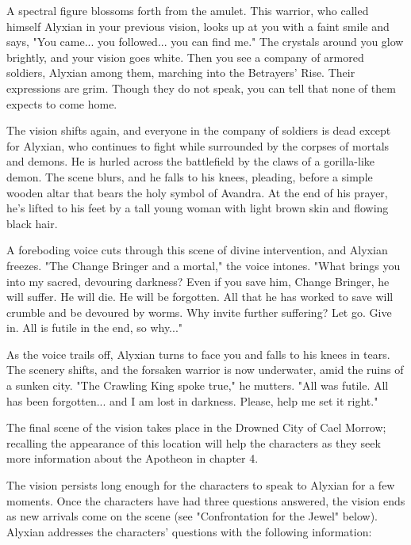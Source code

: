 \documentclass[10pt,a4paper,twoside,twocolumn,openany,nodeprecatedcode]{dndbook}
\begin{document}
\begin{DndReadAloud}{}
A spectral figure blossoms forth from the amulet. This warrior, who called himself Alyxian in your previous vision, looks up at you with a faint smile and says, "You came... you followed... you can find me." The crystals around you glow brightly, and your vision goes white. Then you see a company of armored soldiers, Alyxian among them, marching into the Betrayers' Rise. Their expressions are grim. Though they do not speak, you can tell that none of them expects to come home.

The vision shifts again, and everyone in the company of soldiers is dead except for Alyxian, who continues to fight while surrounded by the corpses of mortals and demons. He is hurled across the battlefield by the claws of a gorilla-like demon. The scene blurs, and he falls to his knees, pleading, before a simple wooden altar that bears the holy symbol of Avandra. At the end of his prayer, he's lifted to his feet by a tall young woman with light brown skin and flowing black hair.

A foreboding voice cuts through this scene of divine intervention, and Alyxian freezes. "The Change Bringer and a mortal," the voice intones. "What brings you into my sacred, devouring darkness? Even if you save him, Change Bringer, he will suffer. He will die. He will be forgotten. All that he has worked to save will crumble and be devoured by worms. Why invite further suffering? Let go. Give in. All is futile in the end, so why..."

As the voice trails off, Alyxian turns to face you and falls to his knees in tears. The scenery shifts, and the forsaken warrior is now underwater, amid the ruins of a sunken city. "The Crawling King spoke true," he mutters. "All was futile. All has been forgotten... and I am lost in darkness. Please, help me set it right."

\end{DndReadAloud}

The final scene of the vision takes place in the Drowned City of Cael Morrow; recalling the appearance of this location will help the characters as they seek more information about the Apotheon in chapter 4.

The vision persists long enough for the characters to speak to Alyxian for a few moments. Once the characters have had three questions answered, the vision ends as new arrivals come on the scene (see "Confrontation for the Jewel" below). Alyxian addresses the characters' questions with the following information:
\end{document}
